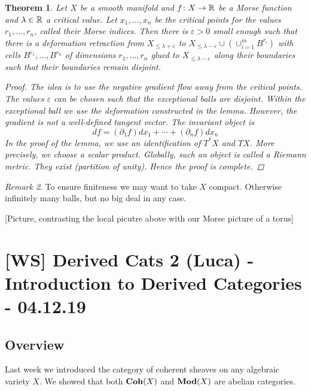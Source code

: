 \documentclass[A4paper, british, reqno]{amsart}
\theoremstyle{darkgreentheorem}
\newtheorem{thm}{Theorem}[section]
\theoremstyle{darkbluedefinition}
\theoremstyle{darkredexample}
\theoremstyle{remark}
\newtheorem{rem}[thm]{Remark}
\newcommand{\1}{\mathbbm{1}}
\begin{document}
\begin{thm}
    Let $X$ be a smooth manifold and $f\colon X\to \mathbb{R}$ be a Morse function and $\lambda\in \mathbb{R}$ a critical value.
    Let $x_{1},\ldots,x_{n}$ be the critical points for the values $r_{1},\ldots,r_{n}$, called their Morse indices.
    Then there is $\varepsilon >0$ small enough such that there is a deformation retraction from $X_{\leqslant \lambda+\varepsilon}$ to $X_{\leqslant \lambda-\varepsilon}\cup (\cup_{i=1}^{m}B^{r_{i}})$ with cells $B^{r_{1}},\ldots,B^{r_{n}}$ of dimensions $r_{1},\ldots,r_{n}$ glued to $X_{\leqslant \lambda-\varepsilon }$ along their boundaries such that their boundaries remain disjoint.
    \begin{proof}
	The idea is to use the negative gradient flow away from the critical points.
	The values $\varepsilon$ can be chosen such that the exceptional balls are disjoint.
	Within the exceptional ball we use the deformation constructed in the lemma.
	However, the gradient is not a well-defined tangent vector.
	The invariant object is
	\[ df=(\partial_{1} f)dx_{1}+\cdots +(\partial_{n} f)dx_{n} \]
	In the proof of the lemma, we use an identification of $T^{*}X$ and $TX$.
	More precisely, we choose a scalar product.
	Globally, such an object is called a Riemann metric.
	They exist (partition of unity).
	Hence the proof is complete.
    \end{proof}
\end{thm}

\begin{rem}
    To ensure finiteness we may want to take $X$ compact.
    Otherwise infinitely many balls, but no big deal in any case.
\end{rem}

[Picture, contrasting the local picutre above with our Morse picture of a torus]

\section{[WS] Derived Cats 2 (Luca) - Introduction to Derived Categories - 04.12.19}

\subsection{Overview}

Last week we introduced the category of coherent sheaves on any algebraic variety $X$.
We showed that both $\mathbf{Coh}(X)$ and $\mathbf{Mod}(X)$ are abelian categories.
\end{document}

